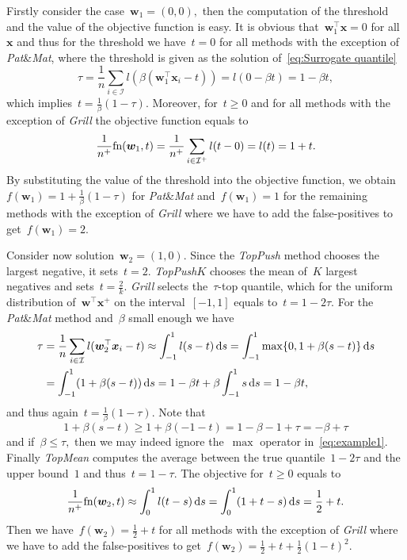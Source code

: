 \documentclass[11pt,a4paper]{article}
\theoremstyle{definition}
\let\originalleft\left
\let\originalright\right
\renewcommand{\left}{\mathopen{}\mathclose\bgroup\originalleft}
\renewcommand{\right}{\aftergroup\egroup\originalright}
\newcommand{\diff}{\mathop{}\!\mathrm{d}}
\newcommand{\I}{\mathcal{I}}
\newcommand{\fn}{\textnormal{fn}}
\newcommand{\toppush}{\textit{TopPush}\xspace}
\newcommand{\toppushk}{\textit{TopPush$K$}\xspace}
\newcommand{\grill}{\textit{Grill}\xspace}
\newcommand{\patmat}{\textit{Pat}\textup{\&}\textit{Mat}\xspace}
\newcommand{\topmean}{\textit{TopMean}\xspace}
\begin{document}
Firstly consider the case~$\bm{w}_1=(0,0),$ then the computation of the threshold and the value of the objective function is easy. It is obvious that~$\bm{w}_1^\top \bm{x}=0$ for all~$\bm{x}$ and thus for the threshold we have~$t=0$ for all methods with the exception of \patmat, where the threshold is given as the solution of~\eqref{eq:Surrogate quantile}
\begin{equation*}
  \tau = \frac{1}{n}\sum_{i \in \I} l(\beta(\bm{w}_{1}^\top \bm{x}_i - t)) = l(0-\beta t) = 1-\beta t,
\end{equation*}
which implies~$t=\frac{1}{\beta}(1-\tau).$ Moreover, for~$t \ge 0$ and for all methods with the exception of \grill the objective function equals to
\begin{equation*}
\frac{1}{n^+}\fn(\bm{w}_1,t) = \frac{1}{n^+}\sum_{i \in \I^+} l(t-0) = l(t) = 1+t.
\end{equation*}
By substituting the value of the threshold into the objective function, we obtain~$f(\bm{w}_1) = 1 + \frac{1}{\beta}(1-\tau)$ for \patmat and~$f(\bm{w}_1) = 1$ for the remaining methods with the exception of \grill where we have to add the false-positives to get~$f(\bm{w}_1) = 2.$

Consider now solution~$\bm{w}_2=(1,0).$ Since the \toppush method chooses the largest negative, it sets~$t=2.$ \toppushk chooses the mean of~$K$ largest negatives and sets~$t=\frac{2}{k}.$ \grill selects the~$\tau$-top quantile, which for the uniform distribution of~$\bm{w}^\top \bm{x}^+$ on the interval~$[-1,1]$ equals to~$t=1-2\tau.$ For the \patmat method and~$\beta$ small enough we have
\begin{equation}\label{eq:example1}
  \begin{aligned}
    \tau & = \frac{1}{n} \sum_{i \in \I} l(\bm{w}_2^\top \bm{x}_i - t) \approx \int_{-1}^1 l(s - t) \diff s = \int_{-1}^1 \max\{0, 1 + \beta(s - t)\} \diff s \\
         & = \int_{-1}^1 \left(1 + \beta(s - t) \right) \diff s = 1 - \beta t + \beta \int_{-1}^1 s \diff s = 1-\beta t,
  \end{aligned}
\end{equation}
and thus again~$t=\frac{1}{\beta}(1-\tau).$ Note that
\begin{equation*}
  1 + \beta(s - t) \ge 1 + \beta(-1 - t) = 1 - \beta - 1 + \tau = - \beta + \tau
\end{equation*}
and if~$\beta \le \tau,$ then we may indeed ignore the~$\max$ operator in~\eqref{eq:example1}. Finally \topmean computes the average between the true quantile~$1 - 2\tau$ and the upper bound~$1$ and thus~$t = 1 - \tau.$ The objective for~$t\ge 0$ equals to
\begin{equation*}
  \frac{1}{n^+} \fn(\bm{w}_2, t) \approx \int_0^1 l(t - s) \diff s = \int_0^1 \left(1 + t - s \right) \diff s = \frac{1}{2} + t.
\end{equation*}
Then we have~$f(\bm{w}_2) = \frac{1}{2} + t$ for all methods with the exception of \grill where we have to add the false-positives to get~$f(\bm{w}_2) = \frac{1}{2} + t + \frac{1}{2}(1-t)^2.$
\end{document}
